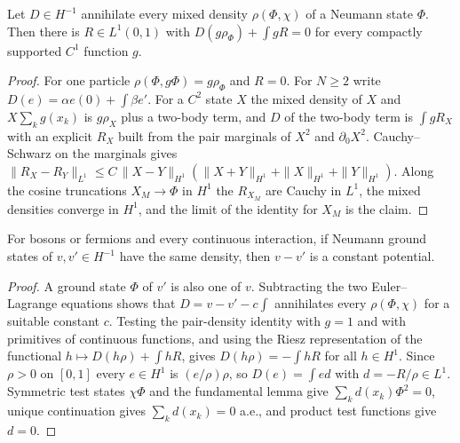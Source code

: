 \begin{theorem}
  \label{thm:neu_pair}
  \leanok
  Let $D\in H^{-1}$ annihilate every mixed density $\rho(\Phi,\chi)$ of a Neumann state $\Phi$. Then there is $R\in L^1(0,1)$
  with $D(g\rho_\Phi)+\int gR=0$ for every compactly supported $C^1$ function $g$.
\end{theorem}
\begin{proof}
  \leanok
  For one particle $\rho(\Phi,g\Phi)=g\rho_\Phi$ and $R=0$. For $N\ge2$ write $D(e)=\alpha e(0)+\int\beta e'$. For a $C^2$
  state $X$ the mixed density of $X$ and $X\sum_k g(x_k)$ is $g\rho_X$ plus a two-body term, and $D$ of the two-body term is
  $\int gR_X$ with an explicit $R_X$ built from the pair marginals of $X^2$ and $\partial_0X^2$. Cauchy--Schwarz on the
  marginals gives $\|R_X-R_Y\|_{L^1}\le C\,\|X-Y\|_{H^1}(\|X+Y\|_{H^1}+\|X\|_{H^1}+\|Y\|_{H^1})$. Along the cosine
  truncations $X_M\to\Phi$ in $H^1$ the $R_{X_M}$ are Cauchy in $L^1$, the mixed densities converge in $H^1$, and the limit
  of the identity for $X_M$ is the claim.
\end{proof}

\begin{theorem}
  \label{thm:neu_hk}
  \leanok
  For bosons or fermions and every continuous interaction, if Neumann ground states of $v,v'\in H^{-1}$ have the same density,
  then $v-v'$ is a constant potential.
\end{theorem}
\begin{proof}
  \leanok
  A ground state $\Phi$ of $v'$ is also one of $v$. Subtracting the two Euler--Lagrange equations shows that
  $D=v-v'-c\int$ annihilates every $\rho(\Phi,\chi)$ for a suitable constant $c$. Testing the pair-density identity with
  $g=1$ and with primitives of continuous functions, and using the Riesz representation of the functional
  $h\mapsto D(h\rho)+\int hR$, gives $D(h\rho)=-\int hR$ for all $h\in H^1$. Since $\rho>0$ on $[0,1]$ every $e\in H^1$ is
  $(e/\rho)\rho$, so $D(e)=\int ed$ with $d=-R/\rho\in L^1$. Symmetric test states $\chi\Phi$ and the fundamental lemma give
  $\sum_kd(x_k)\Phi^2=0$, unique continuation gives $\sum_kd(x_k)=0$ a.e., and product test functions give $d=0$.
\end{proof}

